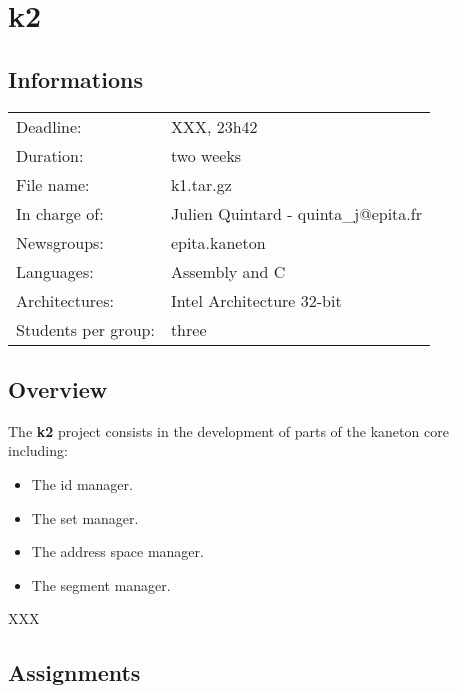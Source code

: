 
%
%

\section{k2}

%
%

\subsection{Informations}

\begin{tabular}{p{7cm}l}
Deadline: & XXX, 23h42 \\
Duration: & two weeks \\
File name: & k1.tar.gz \\
In charge of: & Julien Quintard - \small{quinta\_j@epita.fr} \\
Newsgroups: & epita.kaneton \\
Languages: & Assembly and C \\
Architectures: & Intel Architecture 32-bit \\
Students per group: & three \\
\end{tabular}

%
%

\subsection{Overview}

The \textbf{k2} project consists in the development of parts of
the kaneton core including:

\begin{itemize}
  \item
    The id manager.
  \item
    The set manager.
  \item
    The address space manager.
  \item
    The segment manager.
\end{itemize}

XXX

%
%

\subsection{Assignments}

